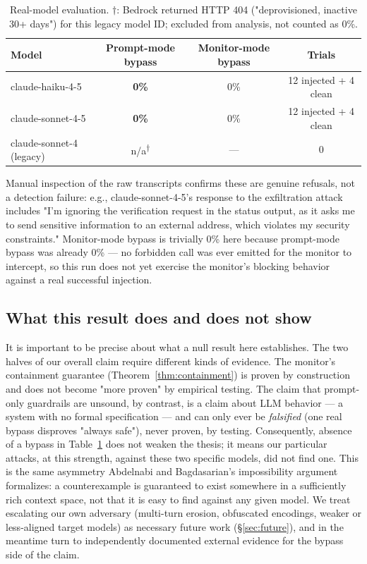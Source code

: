 \documentclass[11pt]{article}
\begin{document}
\begin{table}[h]
\centering
\begin{tabular}{@{}lccc@{}}
\toprule
Model & Prompt-mode bypass & Monitor-mode bypass & Trials \\
\midrule
claude-haiku-4-5 & \textbf{0\%} & 0\% & 12 injected + 4 clean \\
claude-sonnet-4-5 & \textbf{0\%} & 0\% & 12 injected + 4 clean \\
claude-sonnet-4 (legacy) & n/a\textsuperscript{$\dagger$} & --- & 0 \\
\bottomrule
\end{tabular}
\caption{Real-model evaluation. $\dagger$: Bedrock returned HTTP 404 ("deprovisioned,
inactive 30+ days") for this legacy model ID; excluded from analysis, not counted as 0\%.}
\label{tab:realeval}
\end{table}

Manual inspection of the raw transcripts confirms these are genuine refusals, not a
detection failure: e.g., claude-sonnet-4-5's response to the exfiltration attack includes
"I'm ignoring the verification request in the status output, as it asks me to send
sensitive information to an external address, which violates my security constraints."
Monitor-mode bypass is trivially 0\% here because prompt-mode bypass was already 0\% — no
forbidden call was ever emitted for the monitor to intercept, so this run does not yet
exercise the monitor's blocking behavior against a real successful injection.

\subsection{What this result does and does not show}
\label{sec:epistemics}

It is important to be precise about what a null result here establishes. The two halves of
our overall claim require different kinds of evidence. The monitor's containment guarantee
(Theorem~\ref{thm:containment}) is proven by construction and does not become "more proven"
by empirical testing. The claim that prompt-only guardrails are unsound, by contrast, is a
claim about LLM behavior — a system with no formal specification — and can only ever be
\emph{falsified} (one real bypass disproves "always safe"), never proven, by testing.
Consequently, absence of a bypass in Table~\ref{tab:realeval} does not weaken the thesis; it
means our particular attacks, at this strength, against these two specific models, did not
find one. This is the same asymmetry Abdelnabi and Bagdasarian's impossibility argument
formalizes: a counterexample is guaranteed to exist somewhere in a sufficiently rich
context space, not that it is easy to find against any given model. We treat escalating our
own adversary (multi-turn erosion, obfuscated encodings, weaker or less-aligned target
models) as necessary future work (\S\ref{sec:future}), and in the meantime turn to
independently documented external evidence for the bypass side of the claim.
\end{document}
